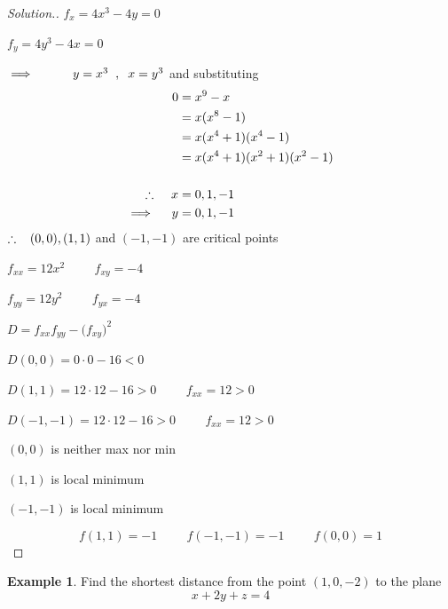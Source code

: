 \documentclass[11pt,a4paper]{article}
\theoremstyle{definition}
\newtheorem{exa}[thm]{Example}
\newenvironment{solution}
  {\renewcommand{\qedsymbol}{}\begin{proof}[\textit{Solution}.]}
  {\end{proof}}
\begin{document}
\begin{solution}


$f_x = 4x^3 - 4y =0$


$f_y = 4y^3 - 4x =0$


$\implies \hspace{1cm} y =x^3\hspace{0.2cm},\hspace{0.2cm} x = y^3$ and substituting
\begin{align*}
0 & = x^9 -x\\
  & = x(x^8 -1)\\
  & = x(x^4 + 1)(x^4 -1)\\
  & = x(x^4 + 1)(x^2 + 1)( x^2 -1)\\\\
\therefore \hspace{0.4cm} x & = 0, 1, -1\\
\implies \hspace{0.4cm} y & = 0,1, -1
\end{align*}
$\therefore\hspace{0.3cm} (0,0), (1,1)$ and $(-1,-1)$ are critical points


$f_{xx} = 12x^2\hspace{1cm} f_{xy} = -4$


$f_{yy} = 12y^2 \hspace{1cm} f_{yx} = -4$


$D = f_{xx}f_{yy} - \big(f_{xy}\big)^2$


$D(0,0) = 0\cdot 0 - 16 <0$


$D(1,1) = 12\cdot 12 - 16 >0 \hspace{1cm} f_{xx} = 12 >0$


$D(-1,-1) = 12\cdot 12 - 16 >0\hspace{1cm} f_{xx} = 12 >0$


$(0,0)$ is neither max nor min


$(1,1)$ is local minimum


$(-1,-1)$ is local minimum

$$f(1,1) = -1\hspace{1cm} f(-1,-1) = -1\hspace{1cm} f(0,0) =1$$
\end{solution}


\begin{exa}


Find the shortest distance from the point $(1,0,-2)$ to the plane $$x + 2y + z = 4$$
\end{exa}
\end{document}

